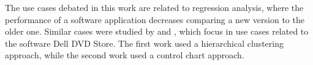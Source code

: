 The use cases debated in this work are related to regression analysis, where the performance of a software application decreases comparing a new version to the older one. Similar cases were studied by \cite{cluster} and \cite{nguyen2012automated_control_chart}, which focus in use cases related to the software Dell DVD Store. The first work used a hierarchical clustering approach, while the second work used a control chart approach.